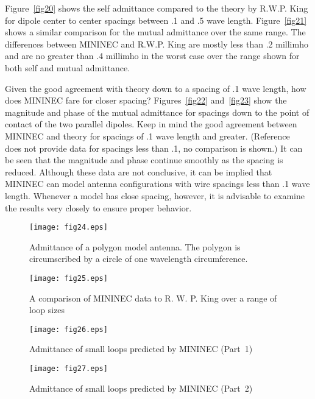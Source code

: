 \documentclass[12pt]{article}
\begin{document}
Figure~\ref{fig20} shows the self admittance compared to the theory by
R.W.P. King \cite{r9} for dipole center to center spacings
between .1 and .5 wave length. Figure~\ref{fig21} shows a similar
comparison for the mutual admittance over the same range. The
differences between MININEC and R.W.P. King are mostly less than .2
millimho and are no greater than .4 millimho in the worst case over the
range shown for both self and mutual admittance.

Given the good agreement with theory down to a spacing of .1 wave
length, how does MININEC fare for closer spacing? Figures~\ref{fig22}
and~\ref{fig23} show the magnitude and phase of the mutual admittance
for spacings down to the point of contact of the two parallel dipoles.
Keep in mind the good agreement between MININEC and theory for spacings
of .1 wave length and greater. (Reference~\cite{r9} does not provide
data for spacings less than .1, no comparison is shown.) It can be seen
that the magnitude and phase continue smoothly as the spacing is
reduced. Although these data are not conclusive, it can be implied that
MININEC can model antenna configurations with wire spacings less than .1
wave length. Whenever a model has close spacing, however, it is
advisable to examine the results very closely to ensure proper behavior.

\begin{sidewaysfigure}[htb]
\centerline{\texttt{[image: fig24.eps]}}
\caption{Admittance of a polygon model antenna. The polygon is
circumscribed by a circle of one wavelength circumference.}
\label{fig24}
\end{sidewaysfigure}

\begin{sidewaysfigure}[htb]
\centerline{\texttt{[image: fig25.eps]}}
\caption{A comparison of MININEC data to R. W. P. King over a range of
loop sizes}
\label{fig25}
\end{sidewaysfigure}

\begin{sidewaysfigure}[htb]
\centerline{\texttt{[image: fig26.eps]}}
\caption{Admittance of small loops predicted by MININEC (Part~1)}
\label{fig26}
\end{sidewaysfigure}

\begin{sidewaysfigure}[htb]
\centerline{\texttt{[image: fig27.eps]}}
\caption{Admittance of small loops predicted by MININEC (Part~2)}
\label{fig27}
\end{sidewaysfigure}
\afterpage\clearpage
\end{document}
